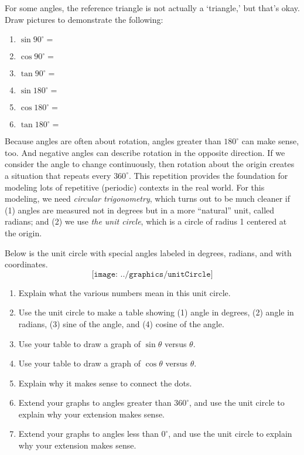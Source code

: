 \begin{prob}
For some angles, the reference triangle is not actually a `triangle,' but that's okay.  Draw pictures to demonstrate the following: 
\begin{enumerate}
\item $\sin 90^\circ =$
\item $\cos 90^\circ =$
\item $\tan 90^\circ =$
\item $\sin 180^\circ =$
\item $\cos 180^\circ =$
\item $\tan 180^\circ =$
\end{enumerate}
\end{prob}

%

Because angles are often about rotation, angles greater than $180^\circ$ can make sense, too.  And negative angles can describe rotation in the opposite direction.  If we consider the angle to change continuously, then rotation about the origin creates a situation that repeats every $360^\circ$.  This repetition provides the foundation for modeling lots of repetitive (periodic) contexts in the real world.  For this modeling, we need \emph{circular trigonometry}, which turns out to be much cleaner if (1) angles are measured not in degrees but in a more ``natural'' unit, called radians; and (2) we use \emph{the unit circle}, which is a circle of radius 1 centered at the origin.   

\begin{prob}
Below is the unit circle with special angles labeled in degrees, radians, and with coordinates. 
$$\texttt{[image: ../graphics/unitCircle]}$$
\begin{enumerate}
\item Explain what the various numbers mean in this unit circle.  
\item Use the unit circle to make a table showing (1) angle in degrees, (2) angle in radians, (3) sine of the angle, and (4) cosine of the angle.  
\item Use your table to draw a graph of $\sin\theta$ versus $\theta$.
\item Use your table to draw a graph of $\cos\theta$ versus $\theta$.
\item Explain why it makes sense to connect the dots. 
\item Extend your graphs to angles greater than $360^\circ$, and use the unit circle to explain why your extension makes sense. 
\item Extend your graphs to angles less than $0^\circ$, and use the unit circle to explain why your extension makes sense.
\end{enumerate}
\end{prob}


